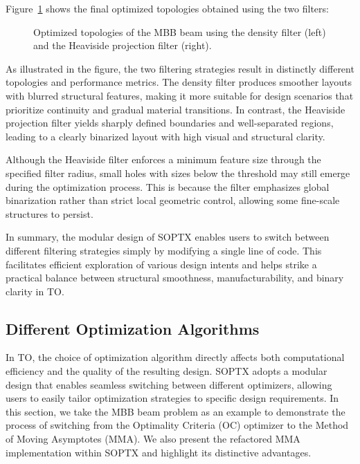 \documentclass[mathpazo]{cicp}
\begin{document}
Figure~\ref{fig:mbb_filter_all} shows the final optimized topologies obtained using the two filters:
\begin{figure}[htp]
	\centering
	\caption{Optimized topologies of the MBB beam using the density filter (left) and the Heaviside projection filter (right).}
	\label{fig:mbb_filter_all}
\end{figure}

As illustrated in the figure, the two filtering strategies result in distinctly different topologies and performance metrics. The density filter produces smoother layouts with blurred structural features, making it more suitable for design scenarios that prioritize continuity and gradual material transitions. In contrast, the Heaviside projection filter yields sharply defined boundaries and well-separated regions, leading to a clearly binarized layout with high visual and structural clarity.

Although the Heaviside filter enforces a minimum feature size through the specified filter radius, small holes with sizes below the threshold may still emerge during the optimization process. This is because the filter emphasizes global binarization rather than strict local geometric control, allowing some fine-scale structures to persist.

In summary, the modular design of SOPTX enables users to switch between different filtering strategies simply by modifying a single line of code. This facilitates efficient exploration of various design intents and helps strike a practical balance between structural smoothness, manufacturability, and binary clarity in TO.

\subsection{Different Optimization Algorithms}
In TO, the choice of optimization algorithm directly affects both computational efficiency and the quality of the resulting design. SOPTX adopts a modular design that enables seamless switching between different optimizers, allowing users to easily tailor optimization strategies to specific design requirements. In this section, we take the MBB beam problem as an example to demonstrate the process of switching from the Optimality Criteria (OC) optimizer to the Method of Moving Asymptotes (MMA). We also present the refactored MMA implementation within SOPTX and highlight its distinctive advantages.
\end{document}
